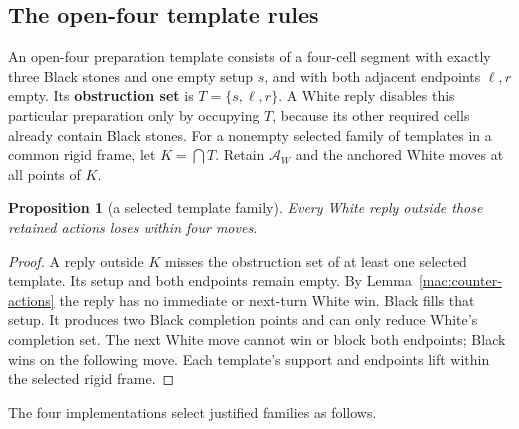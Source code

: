 \documentclass[11pt]{article}
\newtheorem{proposition}[theorem]{Proposition}
\theoremstyle{definition}
\theoremstyle{remark}
\begin{document}
\subsection{The open-four template rules}

An open-four preparation template consists of a four-cell segment with exactly three Black stones and one empty setup \(s\), and with both adjacent endpoints \(\ell,r\) empty. Its \textbf{obstruction set} is \(T=\{s,\ell,r\}\). A White reply disables this particular preparation only by occupying \(T\), because its other required cells already contain Black stones. For a nonempty selected family of templates in a common rigid frame, let \(K=\bigcap T\). Retain \(\mathcal A_W\) and the anchored White moves at all points of \(K\).

\begin{proposition}[a selected template family]\label{mac:template-family}
Every White reply outside those retained actions loses within four moves.

\end{proposition}
\begin{proof}
A reply outside \(K\) misses the obstruction set of at least one selected template. Its setup and both endpoints remain empty. By Lemma~\ref{mac:counter-actions} the reply has no immediate or next-turn White win. Black fills that setup. It produces two Black completion points and can only reduce White's completion set. The next White move cannot win or block both endpoints; Black wins on the following move. Each template's support and endpoints lift within the selected rigid frame. 
\end{proof}

The four implementations select justified families as follows.
\end{document}
